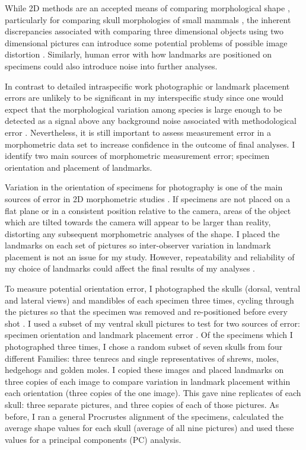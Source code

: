 	While 2D methods are an accepted means of comparing morphological shape \citep[e.g.][]{Adams2004, Mitteroecker2009}, particularly for comparing skull morphologies of small mammals \citep[e.g.][]{Cardini2003, Panchetti2008, White2008, Barrow2008, Scalici2011}, the inherent discrepancies associated with comparing three dimensional objects using two dimensional pictures can introduce some potential problems of possible image distortion \citep{Arnqvist1998}. Similarly, human error with how landmarks are positioned on specimens could also introduce noise into further analyses. 
	
	In contrast to detailed intraspecific work \citep[e.g.][]{Bornholdt2008, Blagojevic2011} photographic or landmark placement errors are unlikely to be significant in my interspecific study since one would expect that the morphological variation among species is large enough to  be detected as a signal above any background noise associated with methodological error \citep{Arnqvist1998}. Nevertheless, it is still important to assess measurement error in a morphometric data set to increase confidence in the outcome of final analyses.
	I identify two main sources of morphometric measurement error; specimen orientation and placement of landmarks.

	Variation in the orientation of specimens for photography is one of the main sources of error in 2D morphometric studies \citep{Adriaens2007}. If specimens are not placed on a flat plane or in a consistent position relative to the camera, areas of the object which are tilted towards the camera will appear to be larger than reality, distorting any subsequent morphometric analyses of the shape. 
	I placed the landmarks on each set of pictures so inter-observer variation in landmark placement is not an issue for my study.  However, repeatability and reliability of my choice of landmarks could affect the final results of my analyses \citep{Arnqvist1998}.

	To measure potential orientation error, I photographed the skulls (dorsal, ventral and lateral views) and mandibles of each specimen three times, cycling through the pictures so that the specimen was removed and re-positioned before every shot \citep{Viscosi2011}.
	I used a subset of my ventral skull pictures to test for two sources of error: specimen orientation and landmark placement error \citep{Arnqvist1998, Barrow2008}. Of the specimens which I photographed three times,  I chose a random subset of seven skulls from four different Families: three tenrecs and single representatives of shrews, moles, hedgehogs and golden moles. I copied these images and placed landmarks on three copies of each image to compare variation in landmark placement within each orientation (three copies of the one image). This gave nine replicates of each skull: three separate pictures, and three copies of each of those pictures. As before, I ran a general Procrustes alignment \citep{Rohlf1993} of the specimens, calculated the average shape values for each skull (average of all nine pictures) and used these values for a principal components (PC) analysis. 
		
